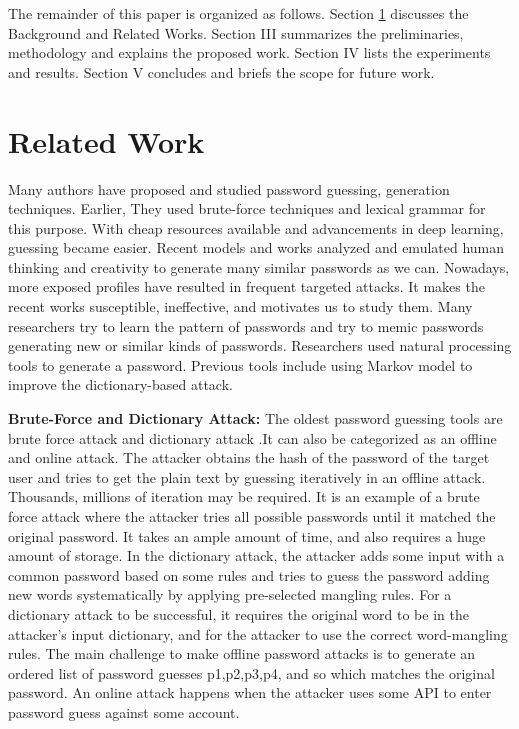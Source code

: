 \documentclass[runningheads]{llncs}
\begin{document}
The remainder of this paper is organized as follows. Section \ref{sec-rel} discusses the Background and Related Works. Section III summarizes the preliminaries, methodology and explains the proposed work. Section IV lists the experiments and results. Section V concludes and briefs the scope for future work.


\section{Related Work}\label{sec-rel}

Many authors have proposed and studied password guessing, generation techniques. Earlier, They used brute-force techniques and lexical grammar for this purpose. With cheap resources available and advancements in deep learning, guessing became easier. Recent models and works analyzed and emulated human thinking and creativity to generate many similar passwords as we can. Nowadays, more exposed profiles have resulted in frequent targeted attacks. It makes the recent works susceptible, ineffective, and motivates us to study them. %
Many researchers try to learn the pattern of passwords and try to memic passwords generating new or similar kinds of passwords. Researchers used natural processing tools to generate a password. Previous tools include using Markov model \cite{Narayanan:2005:FDA:1102120.1102168} to improve the dictionary-based attack.

\textbf{Brute-Force and Dictionary Attack:} The oldest password guessing tools are brute force attack \cite{8400211} and dictionary attack \cite{8400211}.It can also be categorized as an offline and online attack. The attacker obtains the hash of the password of the target user and tries to get the plain text by guessing iteratively in an offline attack. Thousands, millions of iteration may be required. It is an example of a brute force attack where the attacker tries all possible passwords until it matched the original password. It takes an ample amount of time, and also requires a huge amount of storage. In the dictionary attack, the attacker adds some input with a common password based on some rules and tries to guess the password adding new words systematically by applying pre-selected mangling rules. For a dictionary attack to be successful, it requires the original word to be in the attacker's input dictionary, and for the attacker to use the correct word-mangling rules. The main challenge to make offline password attacks is to generate an ordered list of password guesses p1,p2,p3,p4, and so which matches the original password. An online attack happens when the attacker uses some API to enter password guess against some account.
\end{document}
